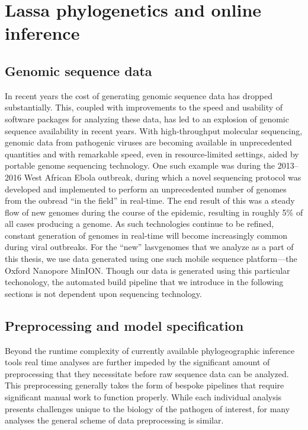 \section{Lassa phylogenetics and online inference}

\subsection{Genomic sequence data}

In recent years the cost of generating genomic sequence data has dropped substantially\cite{sboner2011real}.
This, coupled with improvements to the speed and usability of software packages for analyzing these data, has led to an explosion of genomic sequence availability in recent years.
With high-throughput molecular sequencing, genomic data from pathogenic viruses are becoming available in unprecedented quantities and with remarkable speed, even in resource-limited settings, aided by portable genome sequencing technology.
One such example was during the 2013--2016 West African Ebola outbreak, during which a novel sequencing protocol was developed and implemented to perform an unprecedented number of genomes from the oubread ``in the field'' in real-time\cite{quick2016real}.
The end result of this was a steady flow of new genomes during the course of the epidemic, resulting in roughly 5\% of all cases producing a genome\cite{dudas2017virus}.
As such technologies continue to be refined, constant generation of genomes in real-time will become increasingly common during viral outbreaks\cite{jain2016oxford}.
For the ``new'' \gls{lasv}genomes that we analyze as a part of this thesis, we use data generated using one such mobile sequence platform---the Oxford Nanopore MinION.
Though our data is generated using this particular techonology, the automated build pipeline that we introduce in the following sections is not dependent upon sequencing technology.

\subsection{Preprocessing and model specification}

Beyond the runtime complexity of currently available phylogeographic inference tools real time analyses are further impeded by the significant amount of preprocessing that they necessitate before raw sequence data can be analyzed.
This preprocessing generally takes the form of bespoke pipelines that require significant manual work to function properly.
While each individual analysis presents challenges unique to the biology of the pathogen of interest, for many analyses the general scheme of data preprocessing is similar.

